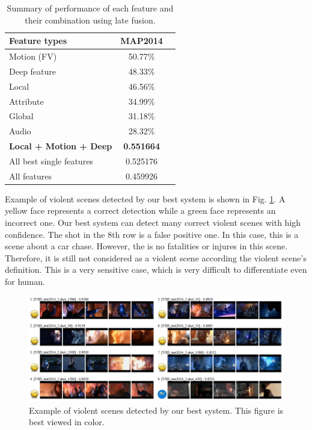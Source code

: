 \documentclass[twocolumn]{bmcart}%
\begin{document}
\begin{table}
	\centering
	\caption{Summary of performance of each feature and their combination using late fusion.}
	\begin{tabular}{lcc}
		\hline
		Feature types & MAP2014 \\ \hline
		Motion (FV) & 50.77\% \\
		Deep feature & 48.33\% \\
		Local & 46.56\% \\
		Attribute & 34.99\% \\
		Global & 31.18\% \\
		Audio & 28.32\% \\  \hline
		\textbf{Local + Motion + Deep} & \textbf{0.551664} \\
		All best single features & 0.525176 \\
		All features & 0.459926 \\ \hline
	\end{tabular}%
	\label{tab:summary}%
\end{table}%
Example of violent scenes detected by our best system is shown in Fig. \ref{fig:bestdemo}. A yellow face represents a correct detection while a green face represents an incorrect one. Our best system can detect many correct violent scenes with high confidence. The shot in the 8th row is a false positive one. In this case, this is a scene about a car chase. However, the is no fatalities or injures in this scene. Therefore, it is still not considered as a violent scene according the violent scene's definition. This is a very sensitive case, which is very difficult to differentiate even for human. 

\begin{figure}
	\centering
	\includegraphics[width=2\linewidth]{Images/BestRun_shot8th_CarChase_NoInjure.png}
	\caption{Example of violent scenes detected by our best system. This figure is best viewed in color.}
	\label{fig:bestdemo}
\end{figure}
\end{document}
